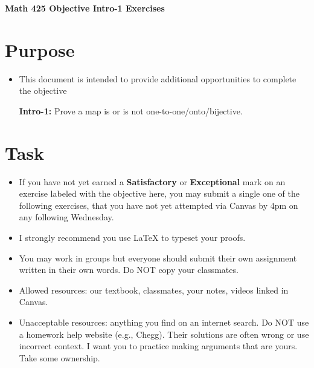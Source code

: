 \documentclass[12pt]{article}
\begin{document}
	\begin{center}
		{\Large \bf Math 425 Objective Intro-1 Exercises}
	\end{center}
	\section*{Purpose}
	\begin{itemize}
		\item This document is intended to provide additional opportunities to complete the objective
		
		\textbf{Intro-1:} Prove a map is or is not one-to-one/onto/bijective.
	\end{itemize}
	\section*{Task}
	\begin{itemize}
		\item If you have not yet earned a \textbf{Satisfactory} or \textbf{Exceptional} mark on an exercise labeled with the objective here, you may submit a single one of the following exercises, that you have not yet attempted via Canvas by 4pm on any following Wednesday.
		\item I strongly recommend you use LaTeX to typeset your proofs.
		\item You may work in groups but everyone should submit their own assignment written in their own words.  Do NOT copy your classmates.
		\item Allowed resources: our textbook, classmates, your notes, videos linked in Canvas.
		\item Unacceptable resources: anything you find on an internet search. Do NOT use a homework help website (e.g., Chegg). Their solutions are often wrong or use incorrect context.  I want you to practice making arguments that are yours. Take some ownership.
	\end{itemize}
\end{document}
